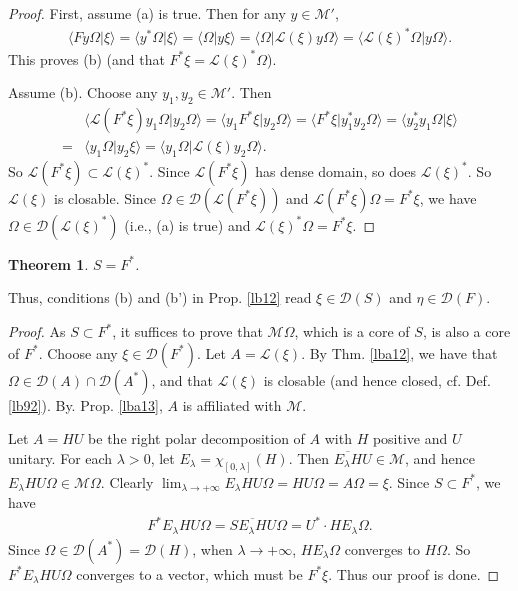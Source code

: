 \documentclass[12pt,b5paper,notitlepage]{article}
\theoremstyle{definition}
\theoremstyle{plain}
\newtheorem{thm}[df]{Theorem}
\newcommand{\mc}{\mathcal}
\newcommand{\Dom}{\scr{D}}
\newcommand{\bk}[1]{\langle {#1}\rangle}
\newcommand{\scr}{\mathscr}
\numberwithin{equation}{section}
\begin{document}
\begin{proof}
First, assume (a) is true. Then for any $y\in\mc M'$,
\begin{align*}
\bk{Fy\Omega|\xi}=\bk{y^*\Omega|\xi}=\bk{\Omega|y\xi}=\bk{\Omega|\scr L(\xi)y\Omega}=\bk{\scr L(\xi)^*\Omega|y\Omega}.
\end{align*}
This proves (b) (and that $F^*\xi=\scr L(\xi)^*\Omega$).

Assume (b). Choose any $y_1,y_2\in\mc M'$. Then
\begin{align*}
&\bk{\scr L(F^*\xi)y_1\Omega|y_2\Omega}=\bk{y_1F^*\xi|y_2\Omega}=\bk{F^*\xi|y_1^*y_2\Omega}=\bk{y_2^*y_1\Omega|\xi}\\
=&\bk{y_1\Omega|y_2\xi}=\bk{y_1\Omega|\scr L(\xi)y_2\Omega}.	
\end{align*}
So $\scr L(F^*\xi)\subset \scr L(\xi)^*$. Since $\scr L(F^*\xi)$ has dense domain, so does $\scr L(\xi)^*$. So $\scr L(\xi)$ is closable. Since $\Omega\in \Dom(\scr L(F^*\xi))$ and $\scr L(F^*\xi)\Omega=F^*\xi$, we have $\Omega\in\Dom(\scr L(\xi)^*)$ (i.e., (a) is true) and $\scr L(\xi)^*\Omega=F^*\xi$.
\end{proof}



\begin{thm}\label{lb93}
	$S=F^*$.
\end{thm}

Thus, conditions (b) and (b') in Prop. \ref{lb12} read $\xi\in\Dom(S)$ and $\eta\in\Dom(F)$.

\begin{proof}
	As $S\subset F^*$, it suffices to prove that $\mathcal M\Omega$, which is a core of $S$, is also a core of $F^*$. Choose any $\xi\in\Dom(F^*)$. Let $A=\scr L(\xi)$. By Thm. \ref{lba12}, we have that $\Omega\in\Dom(A)\cap\Dom(A^*)$, and that $\scr L(\xi)$ is closable (and hence closed, cf. Def. \ref{lb92}). By. Prop. \ref{lba13}, $A$ is affiliated with $\mc M$.

Let $A=HU$ be the right polar decomposition of $A$ with $H$ positive and $U$ unitary. For each $\lambda>0$, let $E_\lambda=\chi_{[0,\lambda]}(H)$. Then $\overline{E_\lambda H}U\in\mathcal M$, and hence $E_\lambda HU\Omega\in\mathcal M\Omega$. Clearly $\lim_{\lambda\rightarrow+\infty}E_\lambda HU\Omega=HU\Omega=A\Omega=\xi$. Since $S\subset F^*$, we have
	\begin{align*}
		F^*E_\lambda HU\Omega=S\overline{E_\lambda H} U\Omega=U^*\cdot HE_\lambda\Omega.
	\end{align*}
Since $\Omega\in\Dom(A^*)=\Dom(H)$, when $\lambda\rightarrow+\infty$, $HE_\lambda\Omega$ converges to $H\Omega$. So $F^*E_\lambda HU\Omega$ converges to a vector, which must be $F^*\xi$. Thus our proof is done.
\end{proof}
\end{document}
